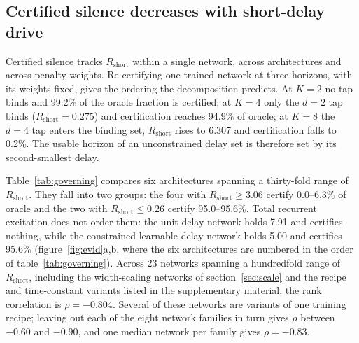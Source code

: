 \documentclass{iopjournal}
\begin{document}
\subsection{Certified silence decreases with short-delay drive}
\label{sec:governing}

Certified silence tracks $R_{\mathrm{short}}$ within a single network, across architectures and across penalty weights. Re-certifying one trained network at three horizons, with its weights fixed, gives the ordering the decomposition predicts. At $K=2$ no tap binds and 99.2\% of the oracle fraction is certified; at $K=4$ only the $d=2$ tap binds ($R_{\mathrm{short}}=0.275$) and certification reaches 94.9\% of oracle; at $K=8$ the $d=4$ tap enters the binding set, $R_{\mathrm{short}}$ rises to 6.307 and certification falls to 0.2\%. The usable horizon of an unconstrained delay set is therefore set by its second-smallest delay.

Table~\ref{tab:governing} compares six architectures spanning a thirty-fold range of $R_{\mathrm{short}}$. They fall into two groups: the four with $R_{\mathrm{short}} \geq 3.06$ certify 0.0--6.3\% of oracle and the two with $R_{\mathrm{short}} \leq 0.26$ certify 95.0--95.6\%. Total recurrent excitation does not order them: the unit-delay network holds 7.91 and certifies nothing, while the constrained learnable-delay network holds 5.00 and certifies 95.6\% (figure~\ref{fig:evid}a,b, where the six architectures are numbered in the order of table~\ref{tab:governing}). Across 23 networks spanning a hundredfold range of $R_{\mathrm{short}}$, including the width-scaling networks of section~\ref{sec:scale} and the recipe and time-constant variants listed in the supplementary material, the rank correlation is $\rho=-0.804$. Several of these networks are variants of one training recipe; leaving out each of the eight network families in turn gives $\rho$ between $-0.60$ and $-0.90$, and one median network per family gives $\rho=-0.83$.
\end{document}
